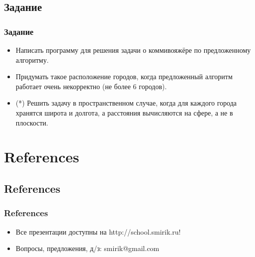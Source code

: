 \documentclass[compress,red]{beamer}
\begin{document}
\subsection{Задание}
\begin{frame}[fragile]
  \frametitle{Задание}
	\begin{itemize}
		\item Написать программу для решения задачи о коммивояжёре по предложенному алгоритму.
		\item Придумать такое расположение городов, когда предложенный алгоритм работает очень некорректно (не более 6 городов).
		\item (*) Решить задачу в пространственном случае, когда для каждого города хранятся широта и долгота, а расстояния вычисляются на сфере, а не в плоскости.
	\end{itemize}
\end{frame}

\section{References}
\subsection{References}
\begin{frame}[fragile]
  \frametitle{References}
  \begin{itemize}
    \item Все презентации доступны на http://school.smirik.ru!
    \item Вопросы, предложения, д/з: smirik@gmail.com
  \end{itemize}
\end{frame}
\end{document}
